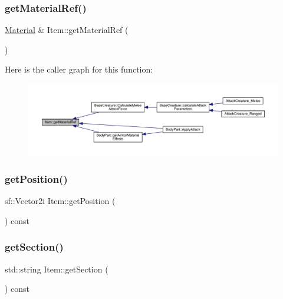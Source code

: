 \mbox{\label{class_item_af22ec5d207b70e2a3359e76dccfc7e11}} 
\subsubsection{\texorpdfstring{get\+Material\+Ref()}{getMaterialRef()}}
{\footnotesize\ttfamily \mbox{\hyperlink{class_material}{Material}} \& Item\+::get\+Material\+Ref (\begin{DoxyParamCaption}{ }\end{DoxyParamCaption})}

Here is the caller graph for this function\+:
\nopagebreak
\begin{figure}[H]
\begin{center}
\leavevmode
\includegraphics[width=350pt]{dc/d32/class_item_af22ec5d207b70e2a3359e76dccfc7e11_icgraph}
\end{center}
\end{figure}
\mbox{\label{class_item_ab015078a1ea19c197fc88b7a556d37cc}} 
\subsubsection{\texorpdfstring{get\+Position()}{getPosition()}}
{\footnotesize\ttfamily sf\+::\+Vector2i Item\+::get\+Position (\begin{DoxyParamCaption}{ }\end{DoxyParamCaption}) const}

\mbox{\label{class_item_abe4ed40d2027ca131b669d471b47f29f}} 
\subsubsection{\texorpdfstring{get\+Section()}{getSection()}}
{\footnotesize\ttfamily std\+::string Item\+::get\+Section (\begin{DoxyParamCaption}{ }\end{DoxyParamCaption}) const}


